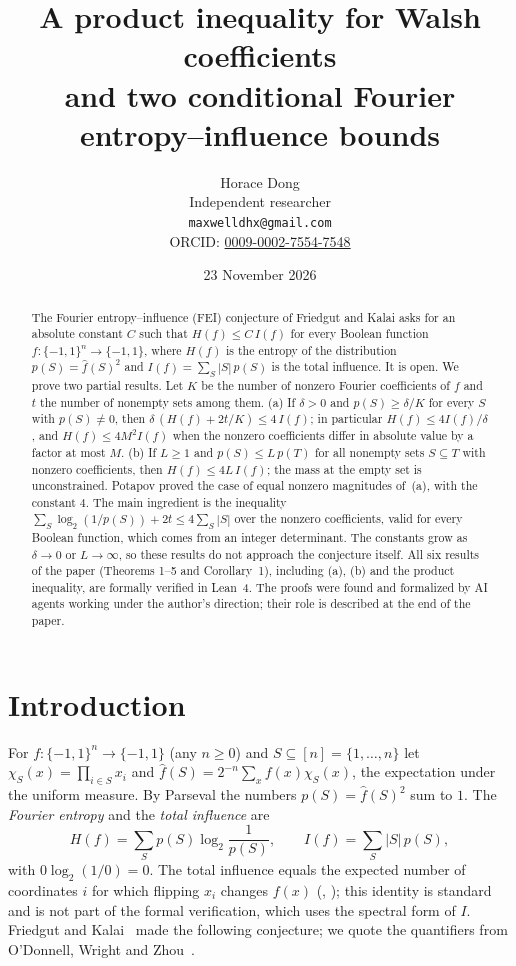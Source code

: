 \documentclass[11pt]{article}
\title{A product inequality for Walsh coefficients\\ and two conditional Fourier
entropy--influence bounds}
\author{Horace Dong\\ \small Independent researcher\\
\small\texttt{maxwelldhx@gmail.com}\\
\small ORCID: \href{https://orcid.org/0009-0002-7554-7548}{0009-0002-7554-7548}}
\date{23 November 2026}
\theoremstyle{definition}
\theoremstyle{remark}
\renewcommand{\lg}{\log_2}
\begin{document}
\sloppy
\maketitle

\begin{abstract}
The Fourier entropy--influence (FEI) conjecture of Friedgut and Kalai asks for
an absolute constant $C$ such that $H(f)\le C\,I(f)$ for every Boolean function
$f:\{-1,1\}^n\to\{-1,1\}$, where $H(f)$ is the entropy of the distribution
$p(S)=\hat f(S)^2$ and $I(f)=\sum_S|S|\,p(S)$ is the total influence. It is
open. We prove two partial results. Let $K$ be the number of nonzero Fourier
coefficients of $f$ and $t$ the number of nonempty sets among them. (a) If
$\delta>0$ and $p(S)\ge\delta/K$ for every $S$ with $p(S)\ne0$, then
$\delta\,(H(f)+2t/K)\le4\,I(f)$; in particular $H(f)\le4I(f)/\delta$, and
$H(f)\le4M^2I(f)$ when the nonzero coefficients differ in absolute value by a
factor at most $M$. (b) If $L\ge1$ and $p(S)\le L\,p(T)$ for all nonempty sets
$S\subseteq T$ with nonzero coefficients, then $H(f)\le4L\,I(f)$; the mass at
the empty set is unconstrained. Potapov proved the case of equal nonzero
magnitudes of~(a), with the constant $4$. The main ingredient is the inequality
$\sum_S\lg(1/p(S))+2t\le4\sum_S|S|$ over the nonzero coefficients, valid for
every Boolean function, which comes from an integer determinant. The constants
grow as $\delta\to0$ or $L\to\infty$, so these results do not approach the
conjecture itself. All six results of the paper (Theorems 1--5 and Corollary~1), including (a), (b) and the
product inequality, are formally verified in Lean~4. The
proofs were found and formalized by AI agents working under the author's
direction; their role is described at the end of the paper.
\end{abstract}

\section{Introduction}\label{sec:intro}

For $f:\{-1,1\}^n\to\{-1,1\}$ (any $n\ge0$) and $S\subseteq[n]=\{1,\dots,n\}$
let $\chi_S(x)=\prod_{i\in S}x_i$ and
$\hat f(S)=2^{-n}\sum_x f(x)\chi_S(x)$, the expectation under the uniform
measure. By Parseval the numbers $p(S)=\hat f(S)^2$ sum to $1$. The
\emph{Fourier entropy} and the \emph{total influence} are
\[
H(f)=\sum_{S}p(S)\lg\frac1{p(S)},\qquad I(f)=\sum_S|S|\,p(S),
\]
with $0\lg(1/0)=0$. The total influence equals the expected number of
coordinates $i$ for which flipping $x_i$ changes $f(x)$
(\cite[Section~2.1]{owz}, \cite[Theorem~2.38]{odo}); this identity is standard
and is not part of the formal verification, which uses the spectral form of
$I$. Friedgut and Kalai~\cite{fk} made the following conjecture; we quote the
quantifiers from O'Donnell, Wright and Zhou~\cite[Section~1]{owz}.
\end{document}
